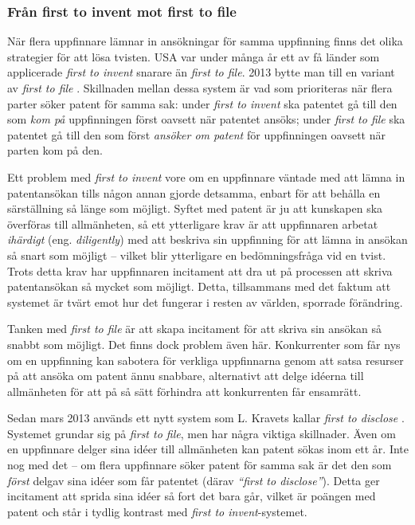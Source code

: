 \subsubsection{Från first to invent mot first to file} 
När flera uppfinnare lämnar in ansökningar för samma uppfinning finns det olika strategier för att lösa tvisten. USA var under många år ett av få länder som applicerade \emph{first to invent} snarare än \emph{first to file}. 2013 bytte man till en variant av \emph{first to file} \cite{kravets}. Skillnaden mellan dessa system är vad som prioriteras när flera parter söker patent för samma sak: under \emph{first to invent} ska patentet gå till den som \emph{kom på} uppfinningen först oavsett när patentet ansöks; under \emph{first to file} ska patentet gå till den som först \emph{ansöker om patent} för uppfinningen oavsett när parten kom på den.


Ett problem med \emph{first to invent} vore om en uppfinnare väntade med att lämna in patentansökan tills någon annan gjorde detsamma, enbart för att behålla en särställning så länge som möjligt. Syftet med patent är ju att kunskapen ska överföras till allmänheten, så ett ytterligare krav är att uppfinnaren arbetat \emph{ihärdigt} (eng. \emph{diligently}) med att beskriva sin uppfinning för att lämna in ansökan så snart som möjligt -- vilket blir ytterligare en bedömningsfråga vid en tvist. Trots detta krav har uppfinnaren incitament att dra ut på processen att skriva patentansökan så mycket som möjligt. Detta, tillsammans med det faktum att systemet är tvärt emot hur det fungerar i resten av världen, sporrade förändring.

Tanken med \emph{first to file} är att skapa incitament för att skriva sin ansökan så snabbt som möjligt. Det finns dock problem även här. Konkurrenter som får nys om en uppfinning kan sabotera för verkliga uppfinnarna genom att satsa resurser på att ansöka om patent ännu snabbare, alternativt att delge idéerna till allmänheten för att på så sätt förhindra att konkurrenten får ensamrätt. 

Sedan mars 2013 används ett nytt system som L. Kravets kallar \emph{first to disclose} \cite{kravets}. Systemet grundar sig på \emph{first to file}, men har några viktiga skillnader. Även om en uppfinnare delger sina idéer till allmänheten kan patent sökas inom ett år. Inte nog med det -- om flera uppfinnare söker patent för samma sak är det den som \emph{först} delgav sina idéer som får patentet (därav \emph{``first to disclose''}). Detta ger incitament att sprida sina idéer så fort det bara går, vilket är poängen med patent och står i tydlig kontrast med \emph{first to invent}-systemet.


